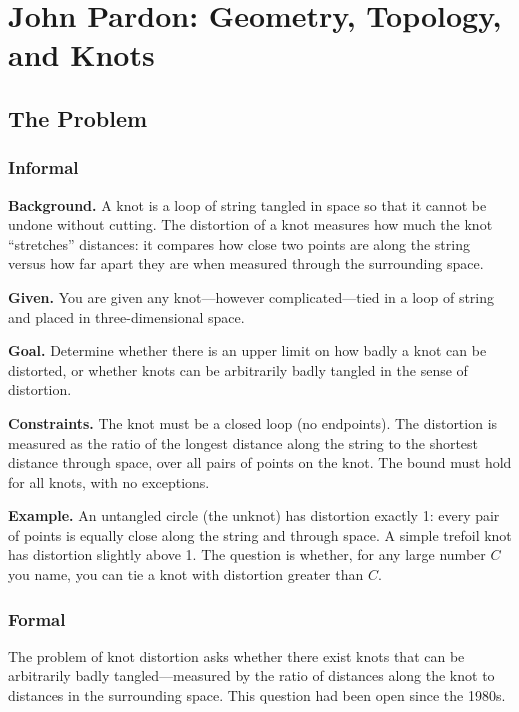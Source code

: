 \let\LocalMacro\relax

\chapter{John Pardon: Geometry, Topology, and Knots}

\section{The Problem}

\subsection{Informal}

\textbf{Background.} A knot is a loop of string tangled in space so that it cannot be undone without cutting. The distortion of a knot measures how much the knot ``stretches'' distances: it compares how close two points are along the string versus how far apart they are when measured through the surrounding space.

\textbf{Given.} You are given any knot---however complicated---tied in a loop of string and placed in three-dimensional space.

\textbf{Goal.} Determine whether there is an upper limit on how badly a knot can be distorted, or whether knots can be arbitrarily badly tangled in the sense of distortion.

\textbf{Constraints.} The knot must be a closed loop (no endpoints). The distortion is measured as the ratio of the longest distance along the string to the shortest distance through space, over all pairs of points on the knot. The bound must hold for all knots, with no exceptions.

\textbf{Example.} An untangled circle (the unknot) has distortion exactly 1: every pair of points is equally close along the string and through space. A simple trefoil knot has distortion slightly above 1. The question is whether, for any large number $C$ you name, you can tie a knot with distortion greater than $C$.

\subsection{Formal}
The problem of knot distortion asks whether there exist knots that can be arbitrarily badly tangled---measured by the ratio of distances along the knot to distances in the surrounding space. This question had been open since the 1980s.

